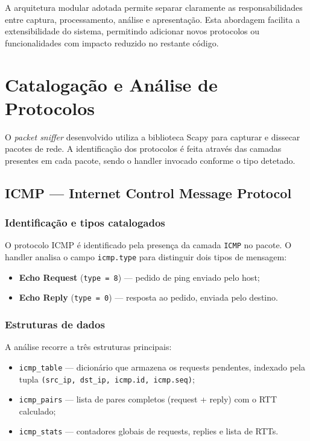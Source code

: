 \documentclass[a4paper,12pt]{article}
\begin{document}
A arquitetura modular adotada permite separar claramente as responsabilidades entre captura, processamento, análise e apresentação. 
Esta abordagem facilita a extensibilidade do sistema, permitindo adicionar novos protocolos ou funcionalidades com impacto reduzido no restante código.


\section{Catalogação e Análise de Protocolos}
 
O \textit{packet sniffer} desenvolvido utiliza a biblioteca Scapy para capturar e dissecar pacotes de rede. 
A identificação dos protocolos é feita através das camadas presentes em cada pacote, sendo o handler invocado conforme o tipo detetado.
 
\subsection{ICMP — Internet Control Message Protocol}
 
\subsubsection{Identificação e tipos catalogados}
 
O protocolo ICMP é identificado pela presença da camada \texttt{ICMP} no pacote. O handler analisa o campo \texttt{icmp.type} para distinguir dois tipos de mensagem:
 
\begin{itemize}
    \item \textbf{Echo Request} (\texttt{type = 8}) — pedido de ping enviado pelo host;
    \item \textbf{Echo Reply} (\texttt{type = 0}) — resposta ao pedido, enviada pelo destino.
\end{itemize}
 
\subsubsection{Estruturas de dados}
 
A análise recorre a três estruturas principais:
 
\begin{itemize}
    \item \texttt{icmp\_table} — dicionário que armazena os requests pendentes, indexado pela tupla \texttt{(src\_ip, dst\_ip, icmp.id, icmp.seq)};
    \item \texttt{icmp\_pairs} — lista de pares completos (request + reply) com o RTT calculado;
    \item \texttt{icmp\_stats} — contadores globais de requests, replies e lista de RTTs.
\end{itemize}
 
\end{document}
